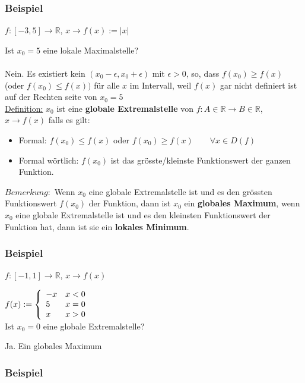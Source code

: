 \documentclass[11pt]{article} %
\begin{document}
\subsubsection{Beispiel}
$f: [-3,5] \rightarrow \mathbb{R}$, $x\rightarrow f(x) := |x|$

Ist $x_0 = 5$ eine lokale Maximalstelle?
\\\\
Nein. Es existiert kein $(x_0 - \epsilon, x_0 + \epsilon)$ mit $\epsilon >0$, so, dass $f(x_0) \geq f(x)$ (oder $f(x_0) \leq f(x))$ für alle $x$ im Intervall, weil $f(x)$ gar nicht definiert ist auf der Rechten seite von $x_0=5$ \\

\underline{Definition:} $x_0$ ist eine {\bf globale Extremalstelle} von $f: A \in \mathbb{R} \rightarrow B \in \mathbb{R}$, $x \rightarrow f(x)$ falls es gilt:
\begin{itemize}
\item Formal: $f(x_0) \leq f(x)$ oder $f(x_0) \geq f(x) \qquad \forall x \in D(f)$
\item Formal wörtlich: $f(x_0)$ ist das grösste/kleinste Funktionswert der ganzen Funktion.
\end{itemize}

$Bemerkung:$ Wenn $x_0$ eine globale Extremalstelle ist und es den grössten Funktionswert $f(x_0)$ der Funktion, dann ist $x_0$ ein {\bf globales Maximum}, wenn $x_0$ eine globale Extremalstelle ist und es den kleinsten Funktionswert der Funktion hat, dann ist sie ein {\bf lokales Minimum}.


\subsubsection{Beispiel}

$f: [-1,1] \rightarrow \mathbb{R}$, $x\rightarrow f(x)$

$f(x) := \left \{ 
\begin{array}{l  l}
	-x & x<0\\
	5 & x=0\\
	x & x > 0
\end{array} \right.$ \\

Ist $x_0 = 0$ eine globale Extremalstelle?

Ja. Ein globales Maximum

\subsubsection{Beispiel}
\end{document}
